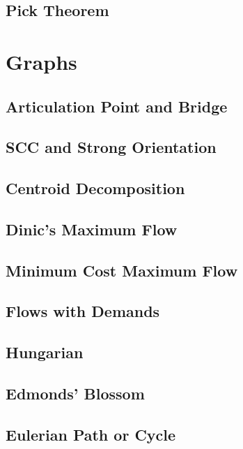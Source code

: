 \subsection{Pick Theorem}

\section{Graphs}
\subsection{Articulation Point and Bridge}

\subsection{SCC and Strong Orientation}

\subsection{Centroid Decomposition}

\subsection{Dinic's Maximum Flow}

\subsection{Minimum Cost Maximum Flow}

\subsection{Flows with Demands}

\subsection{Hungarian}

\subsection{Edmonds' Blossom}

\subsection{Eulerian Path or Cycle}

